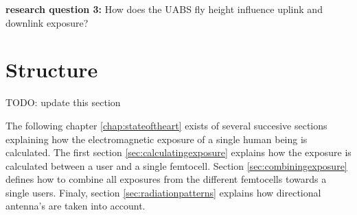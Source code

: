 \textbf{research question 3:} How does the \gls{UABS} fly height influence uplink and downlink exposure?



\section{Structure}
\label{sec:structure}

TODO: update this section

The following chapter \ref{chap:stateoftheart} exists of several succesive sections explaining how the electromagnetic exposure of a single human being is calculated. The first section \ref{sec:calculatingexposure}
explains how the exposure is calculated between a user and a single femtocell. Section \ref{sec:combiningexposure}  defines how to combine all exposures from the different femtocells towards a single users.
Finaly, section \ref{sec:radiationpatterns} explains how directional antenna's are taken into account.

